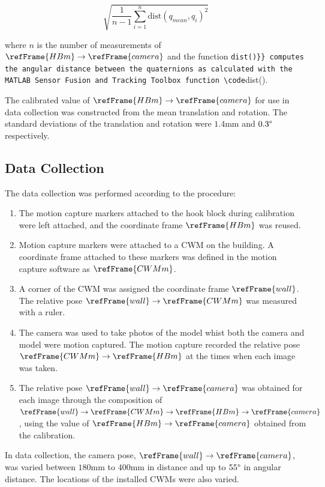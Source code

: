 \documentclass[11pt]{article}
\newcommand{\code}[1]{\colorbox{bj-light-gray}{\Verb{#1}}}
\begin{document}
\begin{equation}
    \sqrt{\frac{1}{n-1}\sum_{i=1}^{n}\text{dist}(q_{mean}, q_i)^2}
\end{equation}

where $n$ is the number of measurements of $\refFrame{HBm}\rightarrow\refFrame{camera}$ and the function \code{dist()} computes the angular distance between the quaternions as calculated with the MATLAB Sensor Fusion and Tracking Toolbox function \code{dist()}.

The calibrated value of $\refFrame{HBm}\rightarrow\refFrame{camera}$ for use in data collection was constructed from the mean translation and rotation. The standard deviations of the translation and rotation were $1.4$mm and $0.3\degree$ respectively.


\subsection*{Data Collection}
The data collection was performed according to the procedure:
\begin{enumerate}
    \item The motion capture markers attached to the hook block during calibration were left attached, and the coordinate frame $\refFrame{HBm}$ was reused.
    \item Motion capture markers were attached to a CWM on the building. A coordinate frame attached to these markers was defined in the motion capture software as $\refFrame{CWMm}$.
    \item A corner of the CWM was assigned the coordinate frame $\refFrame{wall}$. The relative pose $\refFrame{wall}\rightarrow\refFrame{CWMm}$ was measured with a ruler.
    \item The camera was used to take photos of the model whist both the camera and model were motion captured. The motion capture recorded the relative pose $\refFrame{CWMm}\rightarrow\refFrame{HBm}$ at the times when each image was taken.
    \item The relative pose $\refFrame{wall}\rightarrow\refFrame{camera}$ was obtained for each image through the composition of $\refFrame{wall}\rightarrow\refFrame{CWMm}\rightarrow\refFrame{HBm}\rightarrow\refFrame{camera}$, using the value of $\refFrame{HBm}\rightarrow\refFrame{camera}$ obtained from the calibration.
\end{enumerate}

In data collection, the camera pose, $\refFrame{wall}\rightarrow\refFrame{camera}$, was varied between $180$mm to $400$mm in distance and up to $55\degree$ in angular distance. The locations of the installed CWMs were also varied.
\end{document}
